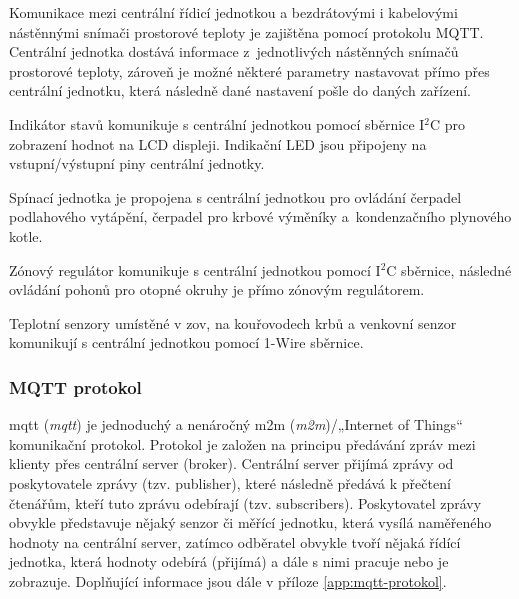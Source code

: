 Komunikace mezi centrální řídicí jednotkou a bezdrátovými i kabelovými nástěnnými snímači prostorové teploty je zajištěna pomocí protokolu MQTT. Centrální jednotka dostává informace z~jednotlivých nástěnných snímačů prostorové teploty, zároveň je možné některé parametry nastavovat přímo přes centrální jednotku, která následně dané nastavení pošle do daných zařízení.

Indikátor stavů komunikuje s centrální jednotkou pomocí sběrnice I$^2$C pro zobrazení hodnot na LCD displeji. Indikační LED jsou připojeny  na vstupní/výstupní piny centrální jednotky.

Spínací jednotka je propojena s centrální jednotkou pro ovládání čerpadel podlahového vytápění, čerpadel pro krbové výměníky a~kondenzačního plynového kotle.

Zónový regulátor komunikuje s centrální jednotkou pomocí I$^2$C sběrnice, následné ovládání pohonů pro otopné okruhy je přímo zónovým regulátorem.

Teplotní senzory umístěné v \acrshort{zov}, na kouřovodech krbů a venkovní senzor komunikují s centrální jednotkou pomocí 1-Wire sběrnice.



\subsubsection{MQTT protokol}
\label{sec:mqtt-protokol}

\acrshort{mqtt} \cite{mqtt-specifikace} (\textit{\acrlong{mqtt}}) je jednoduchý a nenáročný \acrshort{m2m} (\textit{\acrlong{m2m}})/„Internet of Things“ komunikační protokol. Protokol je založen na principu předávání zpráv mezi klienty přes centrální server (broker). Centrální server přijímá zprávy od poskytovatele zprávy (tzv. publisher), které následně předává k přečtení čtenářům, kteří tuto zprávu odebírají (tzv. subscribers). Poskytovatel zprávy obvykle představuje nějaký senzor či měřící jednotku, která vysílá naměřeného hodnoty na centrální server, zatímco odběratel obvykle tvoří nějaká řídící jednotka, která hodnoty odebírá (přijímá) a dále s nimi pracuje nebo je zobrazuje. \cite{vojacek-mqtt} Doplňující informace jsou dále v příloze \ref{app:mqtt-protokol}.

